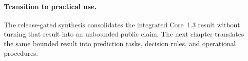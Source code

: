 \begingroup
\small

\endgroup

\paragraph{Transition to practical use.}
The release-gated synthesis consolidates the integrated Core~1.3 result without
turning that result into an unbounded public claim. The next chapter translates
the same bounded result into prediction tasks, decision rules, and operational
procedures.
